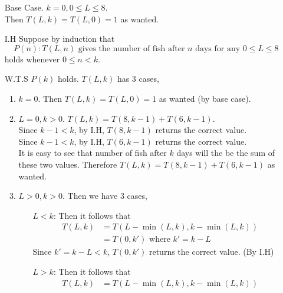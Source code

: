 \documentclass{article}
\begin{document}
\begin{enumerate}
    \item [Base Case.] \(k = 0, 0 \leq L \leq 8\).\\
          Then \(T(L,k) = T(L,0) = 1\) as wanted.
    \item[I.H] Suppose by induction that
        \begin{equation}
            P(n): T(L,n) \textrm{ gives the number of fish after } n \textrm{ days for any } 0 \leq L \leq 8
        \end{equation}
        holds whenever \(0 \leq n < k\).
    \item [W.T.S] \(P(k)\) holds. \(T(L,k)\) has 3 cases,
          \begin{enumerate}
              \item \(k = 0\). Then \(T(L,k) = T(L,0) = 1\) as wanted (by base
                    case).
              \item \(L = 0, k > 0\). \(T(L,k) = T(8, k -1) + T(6, k - 1)\).\\
                    Since \(k - 1 < k\), by I.H, \(T(8, k - 1)\) returns the correct
                    value.\\
                    Since \(k - 1 < k\), by I.H, \(T(6, k - 1)\) returns the correct
                    value.\\
                    It is easy to see that number of fish after \(k\) days will the be
                    the sum of these two values. Therefore \(T(L,k) = T(8, k -1) + T(6,
                    k - 1)\) as wanted.
              \item \(L > 0, k > 0\). Then we have 3 cases,
                    \begin{enumerate}
                        \item[\(L < k\):] Then it follows that
                            \begin{align}
                                T(L,k) & = T(L - \min(L,k), k - \min(L,k))    \\
                                       & =T(0,k') \textrm{ where } k' = k - L
                            \end{align}
                            Since \(k' = k - L < k\), \(T(0,k')\) returns the correct value.
                            (By I.H)
                        \item[\(L > k\):] Then it follows that
                            \begin{align}
                                T(L,k) & = T(L - \min(L,k), k - \min(L,k))    \\

\end{align}
\end{enumerate}
\end{enumerate}
\end{enumerate}
\end{document}
